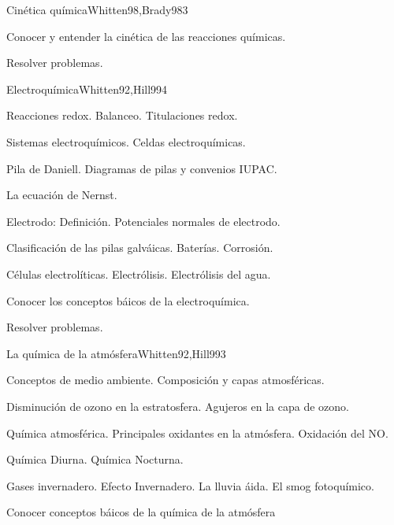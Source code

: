 \begin{syllabus}
\begin{unit}{Cinética química}{Whitten98,Brady98}{3}
   \begin{learningoutcomes}
      \item Conocer y entender la cinética de las reacciones químicas.
      \item Resolver problemas.
   \end{learningoutcomes}
\end{unit}

\begin{unit}{Electroquímica}{Whitten92,Hill99}{4}
\begin{topics}
      \item Reacciones redox. Balanceo. Titulaciones redox.
      \item Sistemas electroquímicos. Celdas electroquímicas.
      \item Pila de Daniell. Diagramas de pilas y convenios IUPAC.
      \item La ecuación de Nernst.
      \item Electrodo: Definición. Potenciales normales de electrodo.
      \item Clasificación de las pilas galváicas. Baterías. Corrosión.
      \item Células electrolíticas. Electrólisis. Electrólisis del agua.
   \end{topics}

   \begin{learningoutcomes}
      \item Conocer los conceptos báicos de la electroquímica.
      \item Resolver problemas.
   \end{learningoutcomes}
\end{unit}

\begin{unit}{La química de la atmósfera}{Whitten92,Hill99}{3}
\begin{topics}
      \item Conceptos de medio ambiente. Composición y capas atmosféricas.
      \item Disminución de ozono en la estratosfera. Agujeros en la capa de ozono.
      \item Química atmosférica. Principales oxidantes en la atmósfera. Oxidación del NO.
      \item Química Diurna. Química Nocturna.
      \item Gases invernadero. Efecto Invernadero. La lluvia áida. El smog fotoquímico.
    \end{topics}

   \begin{learningoutcomes}
      \item Conocer conceptos báicos de la química de la atmósfera
   \end{learningoutcomes}
\end{unit}

\begin{coursebibliography}
\end{coursebibliography}
\end{syllabus}
